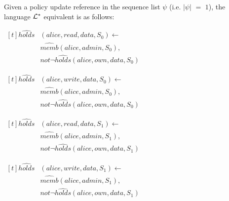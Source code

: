 \documentclass[global,twocolumn,draft]{svjour}
\newenvironment{vquote}
  {\begin{list}{}{\leftmargin 1em}\item[]}
  {\end{list}}
\begin{document}
          Given a policy update reference in the sequence list $\psi$ (i.e.
          $|\psi|$ $=$ $1$), the language ${\cal L}^{*}$ equivalent is as
          follows:

          \begin{vquote}
            \begin{math}
              \begin{aligned}[t]
                \hat{holds}&(alice, read, data, S_{0}) \leftarrow \\
                 & \hat{memb}(alice, admin, S_{0}), \\
                 & not \lnot \hat{holds}(alice, own, data, S_{0})
              \end{aligned}
            \end{math}

            \begin{math}
              \begin{aligned}[t]
                \hat{holds}&(alice, write, data, S_{0}) \leftarrow \\
                 & \hat{memb}(alice, admin, S_{0}), \\
                 & not \lnot \hat{holds}(alice, own, data, S_{0})
              \end{aligned}
            \end{math}

            \begin{math}
              \begin{aligned}[t]
                \hat{holds}&(alice, read, data, S_{1}) \leftarrow \\
                 & \hat{memb}(alice, admin, S_{1}), \\
                 & not \lnot \hat{holds}(alice, own, data, S_{1})
              \end{aligned}
            \end{math}

            \begin{math}
              \begin{aligned}[t]
                \hat{holds}&(alice, write, data, S_{1}) \leftarrow \\
                 & \hat{memb}(alice, admin, S_{1}), \\
                 & not \lnot \hat{holds}(alice, own, data, S_{1})
              \end{aligned}
            \end{math}
          \end{vquote}
\end{document}
